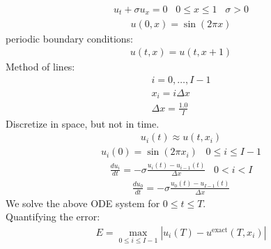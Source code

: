 \documentclass[]{article}
\begin{document}
\begin{eqnarray}
u_{t}+\sigma u_{x}=0 \hspace{10pt} 0\le x \le 1 \hspace{10pt} \sigma>0
\end{eqnarray}
\begin{eqnarray}
u(0,x)=\sin(2\pi x)
\end{eqnarray}
periodic boundary conditions:
\begin{eqnarray}
u(t,x)=u(t,x+1)
\end{eqnarray}
Method of lines:
\begin{eqnarray}
i=0,\ldots,I-1 \\
x_{i}=i\Delta x \\
\Delta x=\frac{1.0}{I}
\end{eqnarray}
Discretize in space, but not in time.
\begin{eqnarray}
u_{i}(t)\approx u(t,x_{i})
\end{eqnarray}
\begin{eqnarray}
u_{i}(0)=\sin(2\pi x_{i}) \hspace{10pt} 0\le i\le I-1
\end{eqnarray}
\begin{eqnarray}
\frac{du_{i}}{dt}=-\sigma\frac{u_{i}(t)-u_{i-1}(t)}{\Delta x} 
\hspace{10pt} 0<i<I
\end{eqnarray}
\begin{eqnarray}
\frac{du_{0}}{dt}=-\sigma\frac{u_{0}(t)-u_{I-1}(t)}{\Delta x} 
\end{eqnarray}
We solve the above ODE system for $0\le t\le T$. \\
Quantifying the error:
\begin{eqnarray}
E=\max_{0\le i\le I-1} |u_{i}(T)-u^{\mbox{exact}}(T,x_{i})|
\end{eqnarray}
\end{document}
